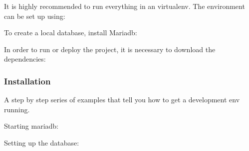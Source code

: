 \documentclass[letterpaper,10pt,english]{sphinxmanual}
\begin{document}
\begin{sphinxVerbatim}[commandchars=\\\{\}]
  
\end{sphinxVerbatim}

It is highly recommended to run everything in an virtualenv. The environment can be set up using:

\begin{sphinxVerbatim}[commandchars=\\\{\}]
     
\end{sphinxVerbatim}

To create a local database, install Mariadb:

\begin{sphinxVerbatim}[commandchars=\\\{\}]
  
\end{sphinxVerbatim}

In order to run or deploy the project, it is necessary to download the dependencies:

\begin{sphinxVerbatim}[commandchars=\\\{\}]
   
\end{sphinxVerbatim}


\subsubsection{Installation}
\label{\detokenize{installation:id1}}
A step by step series of examples that tell you how to get a development env running.

Starting mariadb:

\begin{sphinxVerbatim}[commandchars=\\\{\}]
  
\end{sphinxVerbatim}

Setting up the database:
\end{document}
